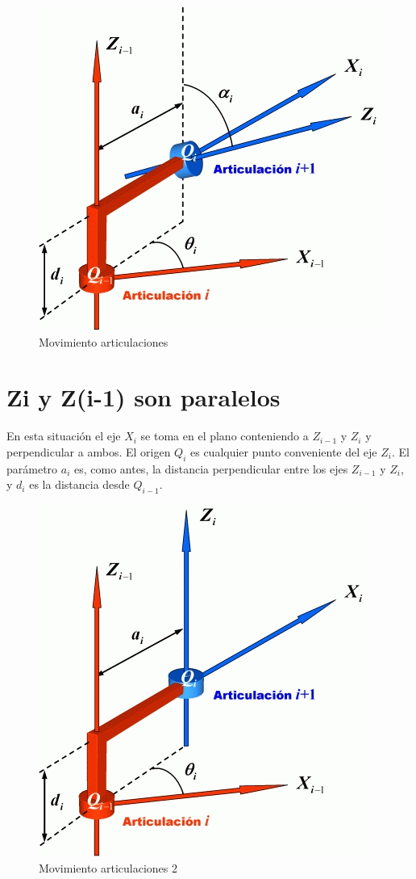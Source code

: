 \documentclass[11pt,a4paper,oldfontcommands,oneside]{memoir}
\begin{document}
\begin{figure}[h]
	\includegraphics[scale=.75]{2.png}
	\caption{Movimiento articulaciones}
	\label{2}
\end{figure}

\section{Zi y Z(i-1) son paralelos}
En esta situación el eje $X_i$ se toma en el plano conteniendo a $Z_{i-1}$ y $Z_i$ y perpendicular a ambos. El origen $Q_i$ es cualquier punto conveniente del eje $Z_i$.
El parámetro $a_i$ es, como antes, la distancia perpendicular entre los ejes $Z_{i-1}$ y $Z_i$, y $d_i$ es la distancia desde $Q_{i-1}$.

\begin{figure}[h]
	\includegraphics[scale=.75]{3.png}
	\caption{Movimiento articulaciones 2}
	\label{3}
\end{figure}
\end{document}
